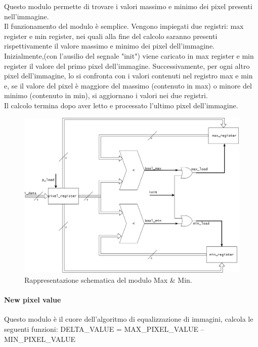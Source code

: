 Questo modulo permette di trovare i valori massimo e minimo dei pixel presenti nell'immagine.\\
Il funzionamento del modulo è semplice. Vengono impiegati due registri: max register e min register, nei quali alla fine del calcolo saranno presenti rispettivamente il valore massimo e minimo dei pixel dell'immagine.\\
Inizialmente,(con l'ausilio del segnale "init") viene caricato in max register e min register il valore del primo pixel dell'immagine. Successivamente, per ogni altro pixel dell'immagine, lo si confronta con i valori contenuti nel registro max e min e, se il valore del pixel è maggiore del massimo (contenuto in max) o minore del minimo (contenuto in min), si aggiornano i valori nei due registri.\\
Il calcolo termina dopo aver letto e processato l'ultimo pixel dell'immagine.

\begin{figure}[h!] %
  \includegraphics[width=\linewidth]{max_min_module}
  \caption{Rappresentazione schematica del modulo Max \& Min.}
  \label{fig:maxMin}
\end{figure}

\paragraph{New pixel value\\}
Questo modulo è il cuore dell'algoritmo di equalizzazione di immagini, calcola le seguenti funzioni:
\doublespacing
\singlespacing
DELTA\_VALUE = MAX\_PIXEL\_VALUE – MIN\_PIXEL\_VALUE

